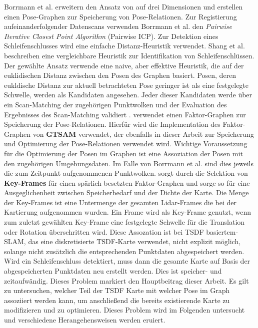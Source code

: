Borrmann et al. \cite{borrmann2008globally} erweitern den Ansatz von \cite{lu1997globally} auf drei Dimensionen und erstellen einen Pose-Graphen zur Speicherung von Pose-Relationen. Zur Registierung aufeinanderfolgender Datenscans verwenden Borrmann et al. \cite{borrmann2008globally} den \textit{Pairwise Iterative Closest Point Algorithm} (Pairwise ICP). Zur Detektion eines Schleifenschlusses wird eine einfache Distanz-Heuristik verwendet. Shang et al. \cite{shan2020lio} beschreiben eine vergleichbare Heuristik zur Identifikation von Schleifenschlüssen. Der gewählte Ansatz verwende eine naive, aber effektive Heuristik, die auf der euklidischen Distanz zwischen den Posen des Graphen basiert. Posen, deren eukldische Distanz zur aktuell betrachteten Pose geringer ist als eine festgelegte Schwelle, werden als Kandidaten angesehen. Jeder dieser Kandidaten werde über ein Scan-Matching der zugehörigen Punktwolken und der Evaluation des Ergebnisses des Scan-Matching validiert \cite{shan2020lio}. \cite{shan2020lio} verwendet einen Faktor-Graphen zur Speicherung der Pose-Relationen. Hierfür wird die Implementation des Faktor-Graphen von \textbf{GTSAM} \cite{dellaert2012factor} verwendet, der ebenfalls in dieser Arbeit zur Speicherung und Optimierung der Pose-Relationen verwendet wird.
Wichtige Voraussetzung für die Optimierung der Posen im Graphen ist eine Assoziation der Posen mit den zugehörigen Umgebungsdaten. Im Falle von Borrmann et al. \cite{borrmann2008globally} sind dies jeweils die zum Zeitpunkt aufgenommenen Punktwolken. \cite{shan2020lio} sorgt durch die Selektion von \textbf{Key-Frames} für einen spärlich besetzten Faktor-Graphen und sorge so für eine Ausgeglichenheit zwischen Speicherbedarf und der Dichte der Karte. Die Menge der Key-Frames ist eine Untermenge der gesamten Lidar-Frames die bei der Kartierung aufgenommen wurden. Ein Frame wird als Key-Frame genutzt, wenn zum zuletzt gewählten Key-Frame eine festgelegte Schwelle für die Translation oder Rotation überschritten wird. Diese Assozation ist bei TSDF basiertem-SLAM, das eine diskretisierte TSDF-Karte verwendet, nicht explizit möglich, solange nicht zusätzlich die entsprechenden Punktdaten abgespeichert werden.
Wird ein Schleifenschluss detektiert, muss dann die gesamte Karte auf Basis der abgespeicherten Punktdaten neu erstellt werden. Dies ist speicher- und zeitaufwändig.
Dieses Problem markiert den Hauptbeitrag dieser Arbeit. Es gilt zu untersuchen, welcher Teil der TSDF Karte mit welcher Pose im Graph assoziiert werden kann, um anschließend die bereits existierende Karte zu modifizieren und zu optimieren.
Dieses Problem wird im Folgenden untersucht und verschiedene Herangehensweisen werden eruiert.


